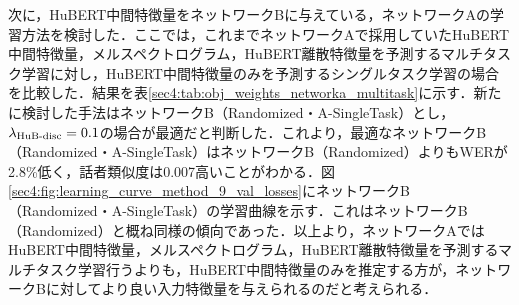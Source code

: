 次に，HuBERT中間特徴量をネットワークBに与えている，ネットワークAの学習方法を検討した．ここでは，これまでネットワークAで採用していたHuBERT中間特徴量，メルスペクトログラム，HuBERT離散特徴量を予測するマルチタスク学習に対し，HuBERT中間特徴量のみを予測するシングルタスク学習の場合を比較した．結果を表\ref{sec4:tab:obj_weights_networka_multitask}に示す．新たに検討した手法はネットワークB（Randomized・A-SingleTask）とし，$\lambda_{\text{HuB-disc}} = 0.1$の場合が最適だと判断した．これより，最適なネットワークB（Randomized・A-SingleTask）はネットワークB（Randomized）よりもWERが2.8\%低く，話者類似度は0.007高いことがわかる．図\ref{sec4:fig:learning_curve_method_9_val_losses}にネットワークB（Randomized・A-SingleTask）の学習曲線を示す．これはネットワークB（Randomized）と概ね同様の傾向であった．以上より，ネットワークAではHuBERT中間特徴量，メルスペクトログラム，HuBERT離散特徴量を予測するマルチタスク学習行うよりも，HuBERT中間特徴量のみを推定する方が，ネットワークBに対してより良い入力特徴量を与えられるのだと考えられる．

\begin{table}[bt]
    \centering
    \caption{ネットワークAにおけるマルチタスク学習の有無による比較}
    \label{sec4:tab:obj_weights_networka_multitask}
    \begin{center}
        \renewcommand{\arraystretch}{1.0} %
        \setlength{\tabcolsep}{8pt}      %
    \end{center}
\end{table}

